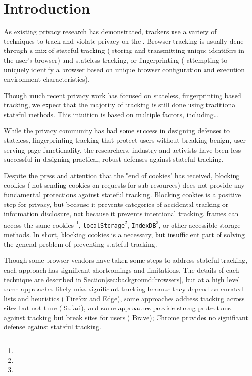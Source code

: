 \section{Introduction}
\label{sec:intro}

As existing \Web{} privacy research has demonstrated, \Web{} trackers use
a variety of techniques to track and violate privacy on the \Web{}. Browser
tracking is usually done through a mix of stateful tracking (\IE{} storing and
transmitting unique identifers in the user's browser) and stateless tracking, or
fingerprinting (\IE{} attempting to uniquely identify a browser based on unique
browser configuration and execution environment characteristics).

Though much recent privacy work has focused on stateless, fingerprinting based
tracking, we expect that the majority of tracking is still done using
traditional stateful methods. This intuition is based on multiple factors,
including…

While the privacy community has had some success in designing defenses
to stateless, fingerprinting tracking that protect users without breaking
benign, user-serving page functionality\cite{laperdrix2017fprandom,
nikiforakis2015privaricator}, the researchers, industry and activists have been
less successful in designing practical, robust defenses against stateful
\TP{} tracking.

Despite the press and attention that the "end of \TP{} cookies" has
received, blocking \TP{} cookies (\IE{} not sending cookies on
requests for \TP{} sub-resources) does not provide any fundamental
protections against stateful \TP{} tracking. Blocking \TP{} cookies is a positive
step for \Web{} privacy, but because it prevents categories of accidental
tracking or information disclosure, not because it prevents intentional
tracking. \TPu{} frames can access the same cookies \footnote{\FNOne{}},
\texttt{localStorage}\footnote{\FNTwo{}}, \texttt{IndexDB}\footnote{\FNThree{}},
or other \JS{} accessible storage methods. In short, blocking \TP{} cookies
is a necessary, but insufficient part of solving the general problem of
preventing stateful \TP{} tracking.

Though some browser vendors have taken some steps to address \TP{} stateful
tracking, each approach has significant shortcomings and limitations.
The details of each technique are described in
Section\ref{sec:background:browsers}, but at a high level some approaches
likely miss significant tracking because they depend on curated lists and
heuristics (\IE{} Firefox and Edge), some approaches address tracking across
sites but not time (\IE{} Safari), and some approaches provide strong
protections against tracking but break sites for users (\IE{} Brave); Chrome
provides no significant defense against \TP{} stateful tracking.

